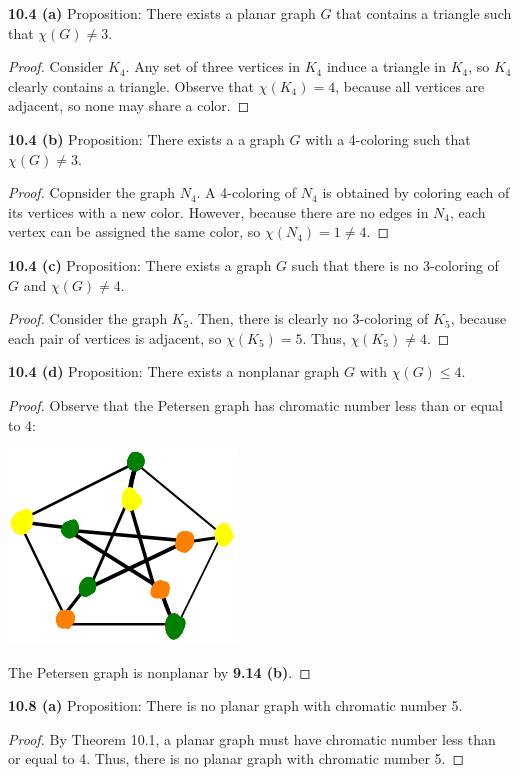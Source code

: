 \documentclass[12pt]{article}
\begin{document}
\newpage
\medskip\noindent\textbf{10.4 (a)} Proposition: There exists a planar graph $G$ that contains a triangle such that $\chi(G) \neq 3$.
\begin{proof}
    Consider $K_4$.
    Any set of three vertices in $K_4$ induce a triangle in $K_4$, so $K_4$ clearly contains a triangle.
    Observe that $\chi(K_4) = 4$, because all vertices are adjacent, so none may share a color.
\end{proof}

\medskip\noindent\textbf{10.4 (b)} Proposition: There exists a a graph $G$ with a 4-coloring such that $\chi(G) \neq 3$.
\begin{proof}
    Copnsider the graph $N_4$.
    A 4-coloring of $N_4$ is obtained by coloring each of its vertices with a new color.
    However, because there are no edges in $N_4$, each vertex can be assigned the same color, so $\chi(N_4) = 1 \neq 4$.
\end{proof}

\medskip\noindent\textbf{10.4 (c)} Proposition: There exists a graph $G$ such that there is no 3-coloring of $G$ and $\chi(G) \neq 4$.
\begin{proof}
    Consider the graph $K_5$.
    Then, there is clearly no 3-coloring of $K_5$, because each pair of vertices is adjacent, so $\chi(K_5) = 5$.
    Thus, $\chi(K_5) \neq 4$.
\end{proof}

\medskip\noindent\textbf{10.4 (d)} Proposition: There exists a nonplanar graph $G$ with $\chi(G) \leq 4$.
\begin{proof}
    Observe that the Petersen graph has chromatic number less than or equal to 4:
    \begin{center}\includegraphics{fig2.png}\end{center}
    The Petersen graph is nonplanar by \textbf{9.14 (b)}.
\end{proof}

\newpage
\medskip\noindent\textbf{10.8 (a)} Proposition: There is no planar graph with chromatic number 5.
\begin{proof}
    By Theorem 10.1, a planar graph must have chromatic number less than or equal to 4.
    Thus, there is no planar graph with chromatic number 5.
\end{proof}
\end{document}
